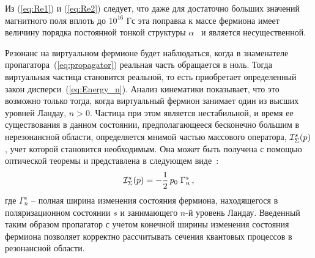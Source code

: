 Из (\ref{eq:Re1}) и (\ref{eq:Re2}) следует, что даже для достаточно больших значений магнитного поля вплоть до $10^{16}$ Гс эта поправка к массе фермиона имеет величину порядка постоянной тонкой структуры $\alpha$~\cite{Kuznetsov:2003,Sokolov:1986} и является несущественной.
 
Резонанс на виртуальном фермионе будет наблюдаться, когда в знаменателе пропагатора~(\ref{eq:propagator}) реальная часть обращается в ноль. Тогда виртуальная частица становится реальной, то есть приобретает определенный закон дисперси~(\ref{eq:Energy_n}). Анализ кинематики показывает, что это возможно только тогда, когда виртуальный фермион занимает один из высших уровней Ландау, $n > 0$. Частица при этом является нестабильной, и время ее существования в данном состоянии,  предполагающееся бесконечно большим в нерезонансной области, определяется мнимой частью массового оператора,  ${\cal I}^{s}_\Sigma (p)$, учет которой становится необходимым. Она может быть получена с помощью оптической теоремы и представлена в следующем виде~\cite{Weldon:1982, Zhukovski:1994}:
%
\begin{eqnarray}
{\cal I}^{s}_\Sigma (p) = - \frac{1}{2}\, p_0 \; \Gamma_n^{s} \, 
,
\label{eq:I_Sigma}
\end{eqnarray}
\noindent где $\Gamma_n^{s}$ -- полная ширина изменения состояния фермиона, 
находящегося 
в поляризационном состоянии $s$ и занимающего  $n$-й уровень Ландау.  Введенный 
таким образом пропагатор с учетом конечной ширины изменения состояния фермиона  
позволяет корректно рассчитывать сечения квантовых процессов в резонансной 
области.